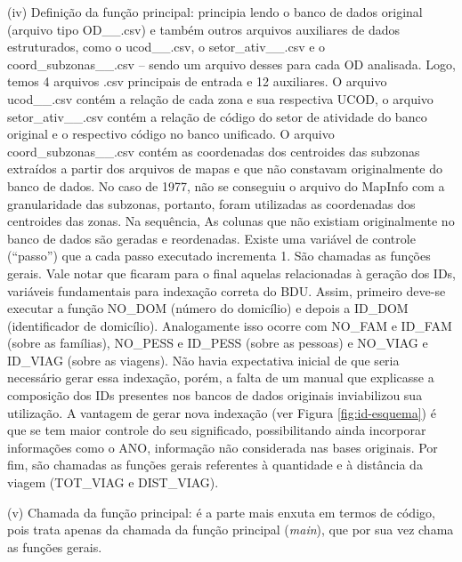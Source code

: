 \begin{compactitem}[]
\item (iv) Definição da função principal: principia lendo o banco de dados original (arquivo tipo OD__.csv) e também outros arquivos auxiliares de dados estruturados, como o ucod__.csv, o setor_ativ__.csv e o coord_subzonas__.csv – sendo um arquivo desses para cada OD analisada. Logo, temos 4 arquivos .csv principais de entrada e 12 auxiliares. O arquivo ucod__.csv contém a relação de cada zona e sua respectiva UCOD, o arquivo setor_ativ__.csv contém a relação de código do setor de atividade do banco original e o respectivo código no banco unificado. O arquivo coord_subzonas__.csv contém as coordenadas dos centroides das subzonas extraídos a partir dos arquivos de mapas e que não constavam originalmente do banco de dados. No caso de 1977, não se conseguiu o arquivo do MapInfo com a granularidade das subzonas, portanto, foram utilizadas as coordenadas dos centroides das zonas. Na sequência, As colunas que não existiam originalmente no banco de dados são geradas e reordenadas. Existe uma variável de controle (``passo'') que a cada passo executado incrementa 1. São chamadas as funções gerais. Vale notar que ficaram para o final aquelas relacionadas à geração dos IDs, variáveis fundamentais para indexação correta do BDU. Assim, primeiro deve-se executar a função NO_DOM (número do domicílio) e depois a ID_DOM (identificador de domicílio). Analogamente isso ocorre com NO_FAM e ID_FAM (sobre as famílias), NO_PESS e ID_PESS (sobre as pessoas) e NO_VIAG e ID_VIAG (sobre as viagens). Não havia expectativa inicial de que seria necessário gerar essa indexação, porém, a falta de um manual que explicasse a composição dos IDs presentes nos bancos de dados originais inviabilizou sua utilização. A vantagem de gerar nova indexação (ver Figura \ref{fig:id-esquema}) é que se tem maior controle do seu significado, possibilitando ainda incorporar informações como o ANO, informação não considerada nas bases originais. Por fim, são chamadas as funções gerais referentes à quantidade e à distância da viagem (TOT_VIAG e DIST_VIAG).\\

\item (v) Chamada da função principal: é a parte mais enxuta em termos de código, pois trata apenas da chamada da função principal (\textit{main}), que por sua vez chama as funções gerais.

\end{compactitem} 


